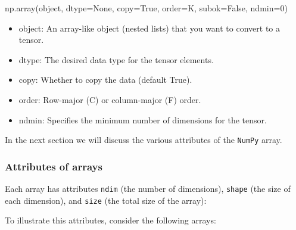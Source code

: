 \documentclass[
  letterpaper,
  DIV=11,
  numbers=noendperiod]{scrreprt}
\newenvironment{Shaded}{\begin{snugshade}}{\end{snugshade}}
\newcommand{\BuiltInTok}[1]{\textcolor[rgb]{0.00,0.23,0.31}{#1}}
\newcommand{\DecValTok}[1]{\textcolor[rgb]{0.68,0.00,0.00}{#1}}
\newcommand{\NormalTok}[1]{\textcolor[rgb]{0.00,0.23,0.31}{#1}}
\newcommand{\OperatorTok}[1]{\textcolor[rgb]{0.37,0.37,0.37}{#1}}
\newcommand{\StringTok}[1]{\textcolor[rgb]{0.13,0.47,0.30}{#1}}
\newcommand{\VariableTok}[1]{\textcolor[rgb]{0.07,0.07,0.07}{#1}}
\providecommand{\tightlist}{%
  \setlength{\itemsep}{0pt}\setlength{\parskip}{0pt}}\usepackage{longtable,booktabs,array}
\theoremstyle{plain}
\theoremstyle{definition}
\theoremstyle{remark}
\begin{document}
\begin{tcolorbox}[enhanced jigsaw, leftrule=.75mm, bottomtitle=1mm, colback=white, toptitle=1mm, opacitybacktitle=0.6, toprule=.15mm, colbacktitle=quarto-callout-note-color!10!white, arc=.35mm, colframe=quarto-callout-note-color-frame, title=\textcolor{quarto-callout-note-color}{\faInfo}\hspace{0.5em}{General Syntax for Creating Tensors Using NumPy}, titlerule=0mm, rightrule=.15mm, left=2mm, bottomrule=.15mm, breakable, coltitle=black, opacityback=0]

\begin{Shaded}
\begin{Highlighting}[]
\NormalTok{np.array(}\BuiltInTok{object}\NormalTok{, dtype}\OperatorTok{=}\VariableTok{None}\NormalTok{, copy}\OperatorTok{=}\VariableTok{True}\NormalTok{, order}\OperatorTok{=}\StringTok{\textquotesingle{}K\textquotesingle{}}\NormalTok{, subok}\OperatorTok{=}\VariableTok{False}\NormalTok{, ndmin}\OperatorTok{=}\DecValTok{0}\NormalTok{)}
\end{Highlighting}
\end{Shaded}

\begin{itemize}
\tightlist
\item
  object: An array-like object (nested lists) that you want to convert
  to a tensor.
\item
  dtype: The desired data type for the tensor elements.
\item
  copy: Whether to copy the data (default True).
\item
  order: Row-major (C) or column-major (F) order.
\item
  ndmin: Specifies the minimum number of dimensions for the tensor.
\end{itemize}

\end{tcolorbox}

In the next section we will discuss the various attributes of the
\texttt{NumPy} array.

\subsubsection{Attributes of arrays}\label{attributes-of-arrays}

Each array has attributes \texttt{ndim} (the number of dimensions),
\texttt{shape} (the size of each dimension), and \texttt{size} (the
total size of the array):

To illustrate this attributes, consider the following arrays:
\end{document}
